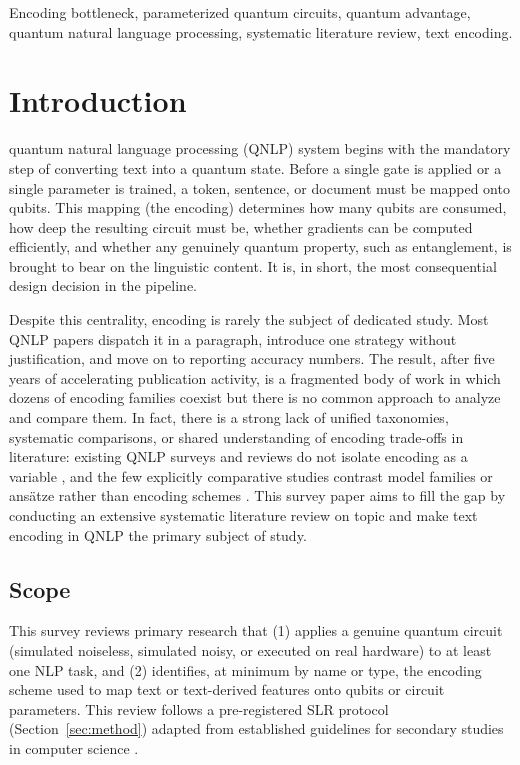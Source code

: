 \documentclass{ieeeaccess}
\begin{document}
\begin{keywords}
Encoding bottleneck, parameterized quantum circuits, quantum advantage, quantum natural language processing, systematic literature review, text encoding.
\end{keywords}

\titlepgskip=-15pt

\maketitle

\section{Introduction}
\label{sec:introduction}
 quantum natural language processing (QNLP) system begins with the mandatory step of converting text into a quantum state. Before a single gate is applied or a single parameter is trained, a token, sentence, or document must be mapped onto qubits. This mapping (the encoding) determines how many qubits are consumed, how deep the resulting circuit must be, whether gradients can be computed efficiently, and whether any genuinely quantum property, such as entanglement, is brought to bear on the linguistic content. It is, in short, the most consequential design decision in the pipeline.

Despite this centrality, encoding is rarely the subject of dedicated study. Most QNLP papers dispatch it in a paragraph, introduce one strategy without justification, and move on to reporting accuracy numbers. The result, after five years of accelerating publication activity, is a fragmented body of work in which dozens of encoding families coexist but there is no common approach to analyze and compare them.  In fact, there is a strong lack of unified taxonomies, systematic comparisons, or shared understanding of encoding trade-offs in literature: existing QNLP surveys and reviews do not isolate encoding as a variable \cite{chen_survey_2024,pallavi_quantum_2025}, and the few explicitly comparative studies contrast model families or ans\"atze rather than encoding schemes \cite{bouakba_comparative_2025,castillo_comparative_2025}. This survey paper aims to fill the gap by conducting an extensive systematic literature review on topic and make text encoding in QNLP the primary subject of study.

\subsection{Scope}
This survey reviews primary research that (1) applies a genuine quantum circuit (simulated noiseless, simulated noisy, or executed on real hardware) to at least one NLP task, and (2) identifies, at minimum by name or type, the encoding scheme used to map text or text-derived features onto qubits or circuit parameters. This review follows a pre-registered SLR protocol (Section~\ref{sec:method}) adapted from established guidelines for secondary studies in computer science \cite{keele2007guidelines}.
\end{document}
